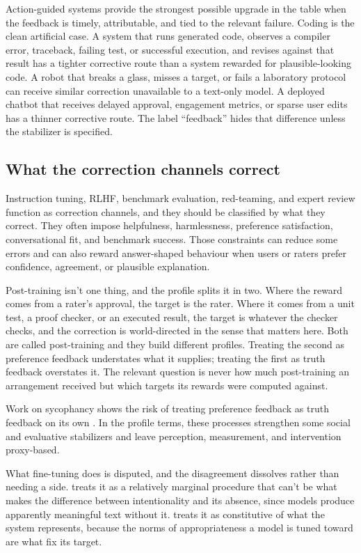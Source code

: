 \documentclass[12pt]{article}
\begin{document}
Action-guided systems provide the strongest possible upgrade in the table when the
feedback is timely, attributable, and tied to the relevant failure. Coding is the clean
artificial case. A system that runs generated code, observes a compiler error, traceback,
failing test, or successful execution, and revises against that result has a tighter
corrective route than a system rewarded for plausible-looking code. A robot that breaks a
glass, misses a target, or fails a laboratory protocol can receive similar correction
unavailable to a text-only model. A deployed chatbot that receives delayed approval,
engagement metrics, or sparse user edits has a thinner corrective route. The label
\enquote{feedback} hides that difference unless the stabilizer is specified.

\subsection{What the correction channels correct}

Instruction tuning, RLHF, benchmark evaluation, red-teaming, and expert review function as
correction channels, and they should be classified by what they correct. They often impose
helpfulness, harmlessness, preference satisfaction, conversational fit, and benchmark
success. Those constraints can reduce some errors and can also reward
answer-shaped behaviour when users or raters prefer confidence, agreement, or plausible
explanation.

Post-training isn't one thing, and the profile splits it in two. Where the reward comes from a rater's approval, the target is the rater. Where
it comes from a unit test, a proof checker, or an executed result, the target is whatever
the checker checks, and the correction is world-directed in the sense that matters here.
Both are called post-training and they build different profiles. Treating the second as
preference feedback understates what it supplies; treating the first as truth feedback
overstates it. The relevant question is never how much post-training an arrangement
received but which targets its rewards were computed against.

Work on sycophancy shows the risk of treating preference feedback as truth feedback
on its own \citep{shapira2026rlhf}. In the profile terms, these processes strengthen some
social and evaluative stabilizers and leave perception, measurement, and intervention
proxy-based.

What fine-tuning does is disputed, and the disagreement dissolves rather than needing a side.
\textcite{grindrod_2024_large_language_models_linguistic_intentionality} treats it as a
relatively marginal procedure that can't be what makes the difference between
intentionality and its absence, since models produce apparently meaningful text without
it. \textcite{ruyant_2026_what_do_llms_represent} treats it as constitutive of what the
system represents, because the norms of appropriateness a model is tuned toward are what
fix its target.
\end{document}
